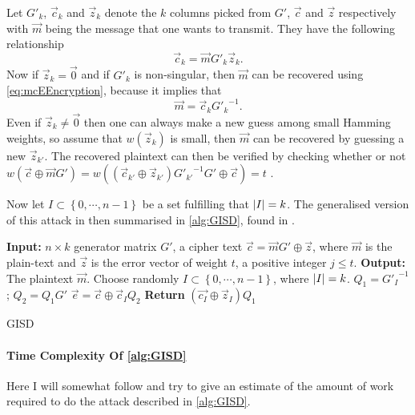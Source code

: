 Let $G'_k$, $\vec{c}_k$ and $\vec{z}_k$ denote the $k$ columns picked from $G'$, $\vec{c}$ and $\vec{z}$ respectively with $\vec{m}$ being the message that one wants to transmit. They have the following relationship
\[
	\vec{c}_k = \vec{m} G'_k \vec{z}_k.
\]
Now if $\vec{z}_k = \vec{0}$ and if $G'_k$ is non-singular, then $\vec{m}$ can be recovered using \cref{eq:mcEEncryption}, because it implies that
\[
	\vec{m} = \vec{c}_{k} {G'_{k}}^{-1}.
\]
Even if $\vec{z}_k \neq \vec{0}$ then one can always make a new guess among small Hamming weights, so assume that $w\left(\vec{z}_k\right)$ is small, then $\vec{m}$ can be recovered by guessing a new $\vec{z}_{k'}$. The recovered plaintext can then be verified by checking whether or not $w\left( \vec{c} \oplus \vec{m} G'\right) = w\left( \left( \vec{c}_{k'} \oplus \vec{z}_{k'}\right) {G'_{k'}}^{-1} G' \oplus \vec{c} \right) = t$ \cite{EOS,KI}.

Now let $I \subset \left\{ 0, \cdots, n-1 \right\}$ be a set fulfilling that $\left\vert I \right\vert = k$. The generalised version of this attack in then summarised in \cref{alg:GISD}, found in \cite{EOS}.

\begin{algorithm}[ht!]
	\centering
	\begin{algorithmic}
		\State \textbf{Input:} $n \times k$ generator matrix $G'$, a cipher text $\vec{c} = \vec{m} G' \oplus \vec{z}$, where $\vec{m}$ is the plain-text and $\vec{z}$ is the error vector of weight $t$, a positive integer $j \leq t$.
		\State \textbf{Output:} The plaintext $\vec{m}$.
		\Statex
			\State Choose randomly $I \subset \left\{ 0, \cdots, n-1 \right\}$, where $\left\vert I \right\vert = k$.
			\State $Q_1 = {G'_I}^{-1}$; $Q_2 = Q_1 G'$
			\State $\vec{e} = \vec{c} \oplus \vec{c}_I Q_2$
						\State \textbf{Return} $\left(\vec{c_I} \oplus \vec{z}_I\right) Q_1$
					\EndIf
				\EndFor
			\EndFor
		\EndWhile
	\end{algorithmic}
	\caption{GISD}
	\label{alg:GISD}
\end{algorithm}

\paragraph{Time Complexity Of \cref{alg:GISD}}

Here I will somewhat follow \cite{EOS,LB} and try to give an estimate of the amount of work required to do the attack described in \cref{alg:GISD}.

